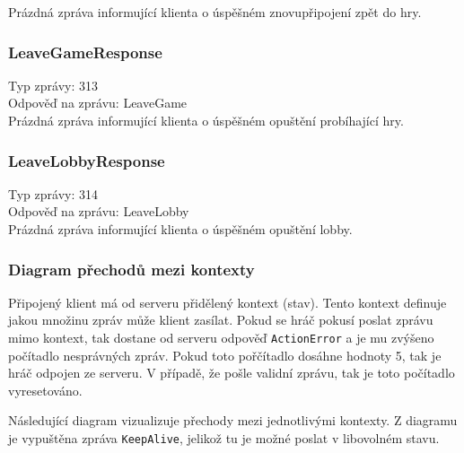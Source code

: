 \documentclass[12pt, a4paper]{article}
\begin{document}
    Prázdná zpráva informující klienta o úspěšném znovupřipojení zpět do hry.


    \subsubsection*{LeaveGameResponse}
    Typ zprávy: 313\\
    Odpověď na zprávu: LeaveGame\\

    Prázdná zpráva informující klienta o úspěšném opuštění probíhající hry.

    \subsubsection*{LeaveLobbyResponse}
    Typ zprávy: 314\\
    Odpověď na zprávu: LeaveLobby\\

    Prázdná zpráva informující klienta o úspěšném opuštění lobby.

    \newpage
    \subsubsection{Diagram přechodů mezi kontexty}
    Připojený klient má od serveru přidělený kontext (stav).
    Tento kontext definuje jakou množinu zpráv může klient zasílat.
    Pokud se hráč pokusí poslat zprávu mimo kontext, tak dostane od serveru odpověď \texttt{ActionError} a je mu zvýšeno počítadlo nesprávných zpráv.
    Pokud toto pořčítadlo dosáhne hodnoty 5, tak je hráč odpojen ze serveru.
    V případě, že pošle validní zprávu, tak je toto počítadlo vyresetováno.

    Následující diagram vizualizuje přechody mezi jednotlivými kontexty.
    Z diagramu je vypuštěna zpráva \texttt{KeepAlive}, jelikož tu je možné poslat v libovolném stavu.
\end{document}
